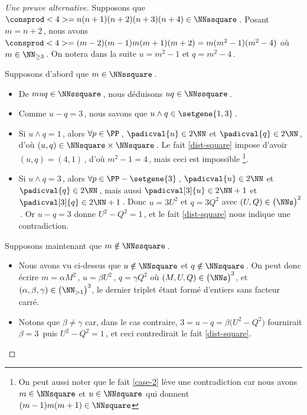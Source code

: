 \begin{proof}[Une preuve alternative]
	Supposons que $\consprod<4> = n(n+1)(n+2)(n+3)(n+4) \in \NNssquare$\,.
	Posant $m = n+2$\,, nous avons $\consprod<4> = (m-2)(m-1)m(m+1)(m+2) = m(m^2 - 1)(m^2 - 4)$ où $m \in \NN_{\geq 3}$\,.
	On notera dans la suite $u = m^2 - 1$ et $q = m^2 - 4$\,.
	
	\medskip
	
	Supposons d'abord que $m \in \NNssquare$\,.
	\begin{itemize}
		\item De $muq \in \NNssquare$\,, nous déduisons $uq \in \NNssquare$\,.

		\item Comme $u - q = 3$\,, nous savons que $u \wedge q \in \setgene{1, 3}$\,.

		\item Si $u \wedge q = 1$\,, 
		alors $\forall p \in \PP$\,, 
		$\padicval{u} \in 2 \NN$ et $\padicval{q} \in 2 \NN$\,,
		d'où 
		$(u, q) \in \NNsquare \times \NNsquare$\,.
		Le fait \ref{dist-square} impose d'avoir $(u, q) = (4, 1)$\,, d'où $m^2 - 1 = 4$\,, mais ceci est impossible
		\footnote{
			On peut aussi noter que le fait \ref{case-2} lève une contradiction car nous avons $m \in \NNsquare$ et $u \in \NNsquare$ qui donnent $(m-1)m(m+1) \in \NNsquare$
		}.

		\item Si $u \wedge q = 3$\,, 
		alors $\forall p \in \PP - \setgene{3}$\,, 
		$\padicval{u} \in 2 \NN$ et $\padicval{q} \in 2 \NN$\,,
		mais aussi $\padicval[3]{u} \in 2 \NN + 1$ et $\padicval[3]{q} \in 2 \NN + 1$\,.
		Donc 
		$u = 3 U^2$ et $q = 3 Q^2$ avec $(U, Q) \in \big( \NNs \big)^2$\,.
		Or $u - q = 3$ donne $U^2 - Q^2 = 1$\,, et le fait \ref{dist-square} nous indique une contradiction.
	\end{itemize}
	
	\medskip
	
	Supposons maintenant que $m \notin \NNssquare$\,.
	\begin{itemize}
		\item Nous avons vu ci-dessus que $u \notin \NNsquare$ et $q \notin \NNsquare$\,. On peut donc écrire $m = \alpha M^2$\,, $u = \beta U^2$\,, $q = \gamma Q^2$ où $(M, U, Q) \in \big( \NNs \big)^3$, et $(\alpha, \beta, \gamma) \in \big( \NN_{>1} \big)^3$, le dernier triplet étant formé d'entiers sans facteur carré.


		\item Notons que $\beta \neq \gamma$ car, dans le cas contraire, $3 = u - q = \beta \big( U^2 - Q^2 \big)$ fournirait $\beta = 3$\, puis $U^2 - Q^2 = 1$\,, et ceci contredirait le fait \ref{dist-square}.



\end{itemize}
\end{proof}
